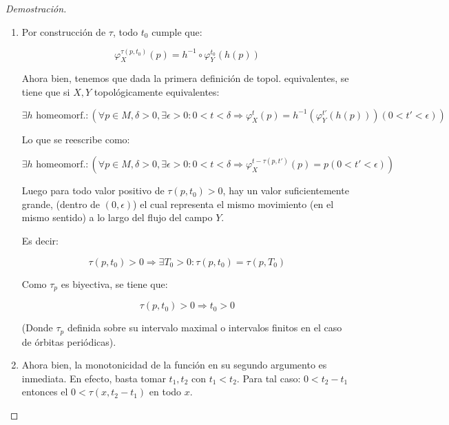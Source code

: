 \begin{proof}[Demostración]
\begin{enumerate}
		La cual es una función biyectiva por cada función de la composición biyectiva sobre su imagen. 
		
		\item Por construcción de $\tau$, todo $t_0$ cumple que:
		
		\begin{equation*}
			\varphi^{\tau(p,t_0)} _X(p) = h^{-1} \circ\varphi_Y^{t_0} (h(p))
		\end{equation*}
		
		Ahora bien, tenemos que dada la primera definición de topol. equivalentes, se tiene que si $X,Y$ topológicamente equivalentes:
		
		\begin{equation*}
			\exists h \text{ homeomorf.}:(\forall p \in M, \delta >0,\exists \epsilon>0: 0<t<\delta \Rightarrow \varphi^t _X(p) = h^{-1}(\varphi_Y^{t'}(h(p))) (0<t'<\epsilon) )
		\end{equation*}
		
		Lo que se reescribe como:
		
		\begin{equation*}
			\exists h \text{ homeomorf.}:(\forall p \in M, \delta >0,\exists \epsilon>0: 0<t<\delta \Rightarrow \varphi^{t- \tau(p,t')} _X(p) = p (0<t'<\epsilon) )
		\end{equation*}
		
		Luego para todo valor positivo de $\tau(p,t_0) >0$, hay un valor suficientemente grande, (dentro de $(0,\epsilon)$) el cual representa el mismo movimiento (en el mismo sentido) a lo largo del flujo del campo $Y$.
		
		Es decir:
		
		\begin{equation*}
			\tau(p,t_0) > 0 \Rightarrow \exists T_0 > 0 : \tau(p,t_0) = \tau(p,T_0)
		\end{equation*}
		
		Como $\tau_p$ es biyectiva, se tiene que:
		
		\begin{equation*}
			\tau(p,t_0) > 0 \Rightarrow t_0 > 0
		\end{equation*}
		
		(Donde $\tau_p$ definida sobre su intervalo maximal o intervalos finitos en el caso de órbitas periódicas).
		
		\item Ahora bien, la monotonicidad de la función en su segundo argumento es inmediata. En efecto, basta tomar $t_1, t_2 $ con $t_1<t_2$. Para tal caso: $0< t_2 - t_1$ entonces el $0< \tau(x,t_2-t_1)$ en todo $x$.
		

\end{enumerate}
\end{proof}
